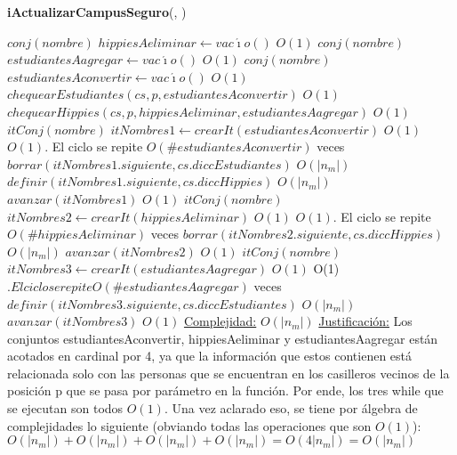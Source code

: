 \begin{Algoritmos}
\begin{algorithm}[H]{\textbf{iActualizarCampusSeguro}(, )}
  \begin{algorithmic}
		\State $conj(nombre)$ $hippiesAeliminar \gets vac\acute{\imath}o()$ \Comment $O(1)$
        \State $conj(nombre)$ $estudiantesAagregar \gets vac\acute{\imath}o()$	\Comment $O(1)$
        \State $conj(nombre)$ $estudiantesAconvertir \gets vac\acute{\imath}o()$	\Comment $O(1)$
		\State $chequearEstudiantes(cs,p,estudiantesAconvertir)$ \Comment $O(1)$
		\State $chequearHippies(cs,p,hippiesAeliminar,estudiantesAagregar)$ \Comment $O(1)$
        \State $itConj(nombre)$ $itNombres1 \gets crearIt(estudiantesAconvertir)$ \Comment $O(1)$
        	\Comment $O(1)$. El ciclo se repite $O(\#estudiantesAconvertir)$ veces
        	\State $borrar(itNombres1.siguiente,cs.diccEstudiantes)$	\Comment $O(|n_{m}|)$
            \State $definir(itNombres1.siguiente,cs.diccHippies)$	\Comment $O(|n_{m}|)$
            \State $avanzar(itNombres1)$	\Comment $O(1)$
        \EndWhile
        \State $itConj(nombre)$ $itNombres2 \gets crearIt(hippiesAeliminar)$ \Comment $O(1)$
        	\Comment $O(1)$. El ciclo se repite  $O(\#hippiesAeliminar)$ veces
        	\State $borrar(itNombres2.siguiente,cs.diccHippies)$	\Comment $O(|n_{m}|)$
            \State $avanzar(itNombres2)$	\Comment $O(1)$
        \EndWhile
        \State $itConj(nombre)$ $itNombres3 \gets crearIt(estudiantesAagregar)$ \Comment $O(1)$
        	\Comment $ $O(1)$. El ciclo se repite O(\#estudiantesAagregar)$ veces
            \State $definir(itNombres3.siguiente,cs.diccEstudiantes)$	\Comment $O(|n_{m}|)$
            \State $avanzar(itNombres3)$	\Comment $O(1)$
        \EndWhile
        \medskip
	\Statex \underline{Complejidad:} $O(|n_{m}|)$
    \Statex \underline{Justificaci\'on:} Los conjuntos estudiantesAconvertir, hippiesAeliminar y estudiantesAagregar est\'an acotados en cardinal por 4, ya que la informaci\'on que estos contienen est\'a relacionada solo con las personas que se encuentran en los casilleros vecinos de la posici\'on p que se pasa por par\'ametro en la funci\'on. Por ende, los tres while que se ejecutan son todos $O(1)$. Una vez aclarado eso, se tiene por \'algebra de complejidades lo siguiente (obviando todas las operaciones que son $O(1)$): $O(|n_{m}|) + O(|n_{m}|) + O(|n_{m}|) + O(|n_{m}|) = O(4|n_{m}|) = O(|n_{m}|)$
  \end{algorithmic}
\end{algorithm}


\end{Algoritmos}
